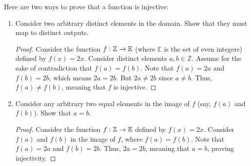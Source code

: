 \documentclass[12pt,letterpaper]{article}
\newcommand\Z{\mathbb Z}
\begin{document}
    
    \begin{figure}[h]
     \centering
    \end{figure}
    
    Here are two ways to prove that a function is injective:
    \begin{enumerate}
        \item Consider two arbitrary distinct elements in the domain. Show that they must map to distinct outputs.
        
        \begin{mdframed}
        \begin{proof}
        Consider the function $f \vcentcolon \Z \rightarrow \mathbb{E}$ (where $\mathbb{E}$ is the set of even integers) defined by $f(x) = 2x$. Consider distinct elements $a,b \in \Z$. Assume for the sake of contradiction that $f(a) = f(b)$. Note that $f(a) = 2a$ and $f(b) = 2b$, which means $2a=2b$. But $2a \neq 2b$ since $a \neq b$. Thus, $f(a) \neq f(b)$, meaning that $f$ is injective.
        \end{proof}
        \end{mdframed}
    
        \item Consider any arbitrary two equal elements in the image of $f$ (say, $f(a)$ and $f(b)$). Show that $a = b$.
        
        \begin{mdframed}
        \begin{proof}
        Consider the function $f \vcentcolon \Z \rightarrow \mathbb{E}$ defined by $f(x) = 2x$. Consider $f(a)$ and $f(b)$ in the image of $f$, where $f(a) = f(b)$. Note that $f(a) = 2a$ and $f(b) = 2b$. Thus, $2a = 2b$, meaning that $a = b$, proving injectivity.
        \end{proof}
        \end{mdframed}
    \end{enumerate}
    
\end{document}
